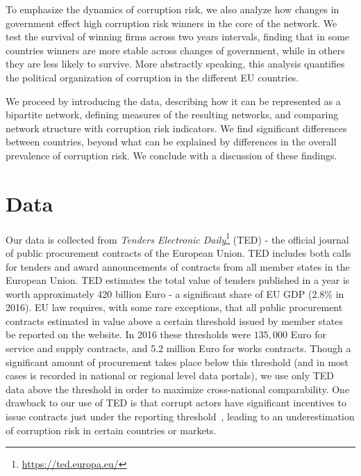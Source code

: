 To emphasize the dynamics of corruption risk, we also analyze how changes in government effect high corruption risk winners in the core of the network. We test the survival of winning firms across two years intervals, finding that in some countries winners are more stable across changes of government, while in others they are less likely to survive. More abstractly speaking, this analysis quantifies the political organization of corruption in the different EU countries.

We proceed by introducing the data, describing how it can be represented as a bipartite network, defining measures of the resulting networks, and comparing network structure with corruption risk indicators. We find significant differences between countries, beyond what can be explained by differences in the overall prevalence of corruption risk. We conclude with a discussion of these findings.

\section{Data}
Our data is collected from \textit{Tenders Electronic Daily}\footnote{\url{https://ted.europa.eu/}} 
(TED) - the official journal of public procurement contracts of the European Union. TED includes both calls for tenders and award announcements of contracts from all member states in the European Union. TED estimates the total value of tenders published in a year is worth approximately 420 billion Euro - a significant share of EU GDP (2.8\% in 2016). EU law requires, with some rare exceptions, that all public procurement contracts estimated in value above a certain threshold issued by member states be reported on the website. In 2016 these thresholds were $135,000$ Euro for service and supply contracts, and 5.2 million Euro for works contracts. Though a significant amount of procurement takes place below this threshold (and in most cases is recorded in national or regional level data portals), we use only TED data above the threshold in order to maximize cross-national comparability. One drawback to our use of TED is that corrupt actors have significant incentives to issue contracts just under the reporting threshold~\cite{szucs2017discretion}, leading to an underestimation of corruption risk in certain countries or markets. 

